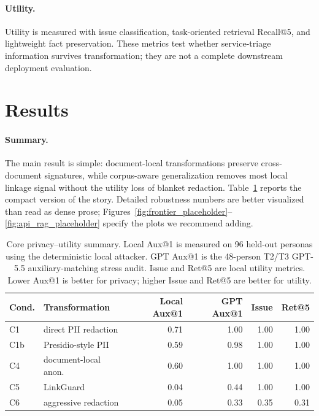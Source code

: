 \documentclass{article}
\newcommand{\method}{LinkGuard}
\begin{document}
\paragraph{Utility.}
Utility is measured with issue classification, task-oriented retrieval Recall@5, and lightweight fact preservation.
These metrics test whether service-triage information survives transformation; they are not a complete downstream deployment evaluation.

\section{Results}

\paragraph{Summary.}
The main result is simple: document-local transformations preserve cross-document signatures, while corpus-aware generalization removes most local linkage signal without the utility loss of blanket redaction.
Table~\ref{tab:core} reports the compact version of the story.
Detailed robustness numbers are better visualized than read as dense prose; Figures~\ref{fig:frontier_placeholder}--\ref{fig:api_rag_placeholder} specify the plots we recommend adding.

\begin{table}[t]
\centering
\small
\setlength{\tabcolsep}{3pt}
\begin{tabular}{llrrrr}
\toprule
Cond. & Transformation & Local Aux@1 & GPT Aux@1 & Issue & Ret@5 \\
\midrule
C1 & direct PII redaction & 0.71 & 1.00 & 1.00 & 1.00 \\
C1b & Presidio-style PII & 0.59 & 0.98 & 1.00 & 1.00 \\
C4 & document-local anon. & 0.60 & 1.00 & 1.00 & 1.00 \\
C5 & \method{} & 0.04 & 0.44 & 1.00 & 1.00 \\
C6 & aggressive redaction & 0.05 & 0.33 & 0.35 & 0.31 \\
\bottomrule
\end{tabular}
\caption{Core privacy--utility summary. Local Aux@1 is measured on 96 held-out personas using the deterministic local attacker. GPT Aux@1 is the 48-person T2/T3 GPT-5.5 auxiliary-matching stress audit. Issue and Ret@5 are local utility metrics. Lower Aux@1 is better for privacy; higher Issue and Ret@5 are better for utility.}
\label{tab:core}
\end{table}
\end{document}
